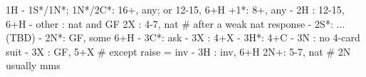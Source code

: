 1H - 1S*/1N*; 1N*/2C*: 16+, any; or 12-15, 6+H
+1*: 8+, any
   - 2H : 12-15, 6+H
   - other : nat and GF
2X : 4-7, nat
# after a weak nat response
   - 2S*: ... (TBD)
   - 2N*: GF, some 6+H
        - 3C*: ask
             - 3X : 4+X
             - 3H*: 4+C
             - 3N : no 4-card suit
   - 3X : GF, 5+X  # except raise = inv
   - 3H : inv, 6+H
2N+: 5-7, nat  # 2N usually mms